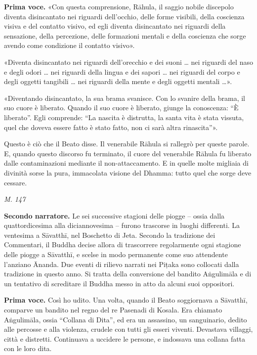\textbf{Prima voce.} «Con questa comprensione, Rāhula, il saggio nobile discepolo
diventa disincantato nei riguardi dell’occhio, delle forme visibili,
della coscienza visiva e del contatto visivo, ed egli diventa
disincantato nei riguardi della sensazione, della percezione, delle
formazioni mentali e della coscienza che sorge avendo come condizione il
contatto visivo».


«Diventa disincantato nei riguardi dell’orecchio e dei suoni … nei
riguardi del naso e degli odori … nei riguardi della lingua e dei sapori
… nei riguardi del corpo e degli oggetti tangibili … nei riguardi della
mente e degli oggetti mentali …».


«Diventando disincantato, la sua brama svanisce. Con lo svanire della
brama, il suo cuore è liberato. Quando il suo cuore è liberato, giunge
la conoscenza: “È liberato”. Egli comprende: “La nascita è distrutta, la
santa vita è stata vissuta, quel che doveva essere fatto è stato fatto,
non ci sarà altra rinascita”».


Questo è ciò che il Beato disse. Il venerabile Rāhula si rallegrò per
queste parole. E, quando questo discorso fu terminato, il cuore del
venerabile Rāhula fu liberato dalle contaminazioni mediante il
non-attaccamento. E in quelle molte migliaia di divinità sorse la pura,
immacolata visione del Dhamma: tutto quel che sorge deve cessare.


\emph{M. 147}


\textbf{Secondo narratore.} Le sei successive stagioni delle piogge – ossia dalla
quattordicesima alla diciannovesima – furono trascorse in luoghi
differenti. La ventesima a Sāvatthī, nel Boschetto di Jeta. Secondo la
tradizione dei Commentari, il Buddha decise allora di trascorrere
regolarmente ogni stagione delle piogge a Sāvatthī, e scelse in modo
permanente come suo attendente l’anziano Ānanda. Due eventi di rilievo
narrati nei Piṭaka sono collocati dalla tradizione in questo anno. Si
tratta della conversione del bandito Aṅgulimāla e di un tentativo di
screditare il Buddha messo in atto da alcuni suoi oppositori.


\textbf{Prima voce.} Così ho udito. Una volta, quando il Beato soggiornava a
Sāvatthī, comparve un bandito nel regno del re Pasenadi di Kosala. Era
chiamato Aṅgulimāla, ossia “Collana di Dita”, ed era un assassino, un
sanguinario, dedito alle percosse e alla violenza, crudele con tutti gli
esseri viventi. Devastava villaggi, città e distretti. Continuava a
uccidere le persone, e indossava una collana fatta con le loro dita.


